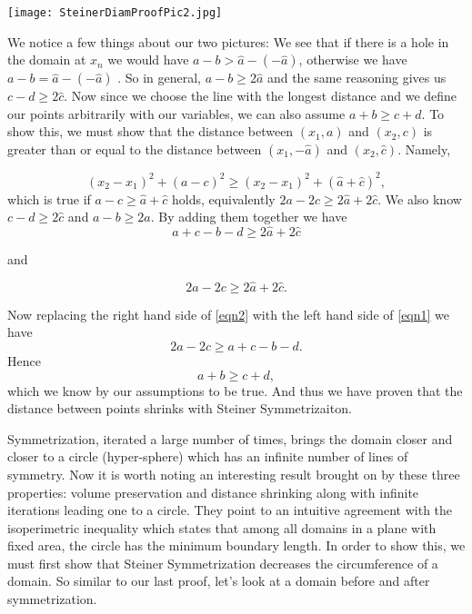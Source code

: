 \documentclass[12pt]{report}
\numberwithin{definition}{section}
\begin{document}
 	  
 	
 		\texttt{[image: SteinerDiamProofPic2.jpg]}
 		
 	  
 	
 	We  notice a few things about our two pictures: We see that if there is a hole in the domain at $x_n$ we would have $a-b>\hat{a}-(-\hat{a})$, otherwise we have $a-b = \hat{a}-(-\hat{a})$	. So in general, $a-b \geq 2\hat{a}$ and the same reasoning gives us $c-d \geq 2\hat{c}$. Now since we choose the line with the longest distance and we define our points arbitrarily with our variables, we can also assume $a+b \geq c+d$. To show this, we must show that the distance between  $(x_1, a)$ and $(x_2, c)$ is greater than or equal to the distance between $(x_1, -\hat{a})$ and $(x_2, \hat{c})$. Namely, 

 	\[
 	(x_2-x_1)^2+(a-c)^2 \geq (x_2-x_1)^2+(\hat{a}+\hat{c})^2 , 
 	\]
 	which is true if $a-c\geq \hat{a}+\hat{c}$ holds, equivalently  $2a-2c\geq 2\hat{a}+2\hat{c}$.  We also know $c-d \geq 2\hat{c}$ and  $a-b \geq 2\hat{a}$. By adding them together we have 
 	\begin{equation} \label{eqn1}
 	a+c-b-d\geq 2\hat{a}+2\hat{c}
 \end{equation}
 	
 and
 	
    \begin{equation} \label{eqn2}
 	2a-2c\geq 2\hat{a}+2\hat{c}.
 	\end{equation}
 	
 	Now replacing the right hand side of \eqref{eqn2} with the left hand side of \eqref{eqn1} we have 
 	\[
 	2a-2c\geq 	a+c-b-d.
 	\]
 	Hence
 	\[
 	a+b \geq c+d,
 	\]
 	which we know by our assumptions to be true. And thus we have proven that the distance between points shrinks with Steiner Symmetrizaiton. 
 	
 	Symmetrization, iterated a large number of times, brings the domain closer and closer to a circle (hyper-sphere) which has an infinite number of lines of symmetry. Now it is worth noting an interesting result brought on by these three properties: volume preservation and distance shrinking along with infinite iterations leading one to a circle. They point to an intuitive agreement with the isoperimetric inequality which states that among all domains in a plane with fixed area, the circle has the minimum boundary length. In order to show this, we must first show that Steiner Symmetrization decreases the circumference of a domain. So similar to our last proof, let's look at a domain before and after symmetrization. 
 	
\end{document}
